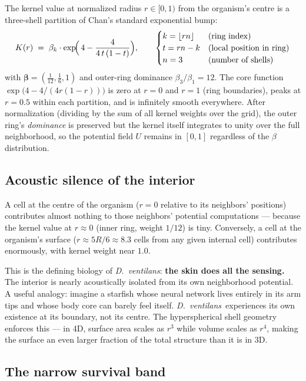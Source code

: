 \documentclass[11pt,a4paper]{article}
\newcommand{\spc}[1]{\textit{#1}}  %
\newcommand{\DV}{\spc{D.\ ventilans}}
\begin{document}
The kernel value at normalized radius $r\in[0,1)$ from the organism's
centre is a three-shell partition of Chan's standard exponential bump:
\begin{equation}
K(r) \;=\; \beta_{k}\cdot
\exp\!\Bigl(\,4-\frac{4}{4\,t\,(1-t)}\Bigr),
\qquad
\begin{cases}
k = \lfloor r n \rfloor & \text{(ring index)}\\
t = r n - k & \text{(local position in ring)}\\
n = 3 & \text{(number of shells)}
\end{cases}
\end{equation}
with $\boldsymbol{\beta}=(\tfrac{1}{12},\tfrac{1}{6},1)$ and outer-ring
dominance $\beta_{3}/\beta_{1}=12$. The core function $\exp\!\bigl(4 -
4/(4r(1-r))\bigr)$ is zero at $r=0$ and $r=1$ (ring boundaries), peaks at
$r=0.5$ within each partition, and is infinitely smooth everywhere. After
normalization (dividing by the sum of all kernel weights over the grid),
the outer ring's \emph{dominance} is preserved but the kernel itself
integrates to unity over the full neighborhood, so the potential field
$U$ remains in $[0,1]$ regardless of the $\beta$ distribution.

\subsection{Acoustic silence of the interior}

A cell at the centre of the organism ($r=0$ relative to its neighbors'
positions) contributes almost nothing to those neighbors' potential
computations --- because the kernel value at $r\approx 0$ (inner ring,
weight $1/12$) is tiny. Conversely, a cell at the organism's surface
($r\approx 5R/6\approx 8.3$ cells from any given internal cell)
contributes enormously, with kernel weight near $1.0$.

This is the defining biology of \DV: \textbf{the skin does all the
sensing.} The interior is nearly acoustically isolated from its own
neighborhood potential. A useful analogy: imagine a starfish whose neural
network lives entirely in its arm tips and whose body core can barely feel
itself. \DV\ experiences its own existence at its boundary, not its
centre. The hyperspherical shell geometry enforces this --- in 4D, surface
area scales as $r^{3}$ while volume scales as $r^{4}$, making the surface
an even larger fraction of the total structure than it is in 3D.

\subsection{The narrow survival band}
\end{document}
